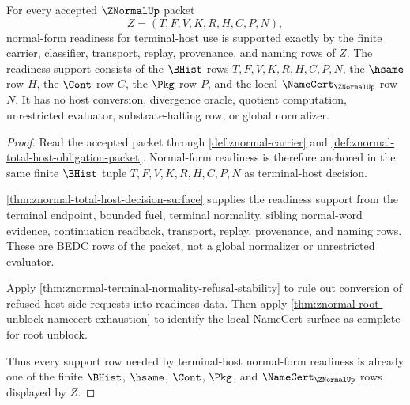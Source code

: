 \begin{theorem}
\label{thm:znormal-normal-form-readiness-support-totality}
For every accepted $\ZNormalUp$ packet
$$
Z=(T,F,V,K,R,H,C,P,N),
$$
normal-form readiness for terminal-host use is supported exactly by the finite carrier, classifier, transport, replay, provenance, and naming rows of $Z$. The readiness support consists of the $\BHist$ rows $T,F,V,K,R,H,C,P,N$, the $\hsame$ row $H$, the $\Cont$ row $C$, the $\Pkg$ row $P$, and the local $\NameCert_{\ZNormalUp}$ row $N$. It has no host conversion, divergence oracle, quotient computation, unrestricted evaluator, substrate-halting row, or global normalizer.
\end{theorem}
\begin{proof}
Read the accepted packet through \autoref{def:znormal-carrier} and \autoref{def:znormal-total-host-obligation-packet}. Normal-form readiness is therefore anchored in the same finite $\BHist$ tuple $T,F,V,K,R,H,C,P,N$ as terminal-host decision.

\autoref{thm:znormal-total-host-decision-surface} supplies the readiness support from the terminal endpoint, bounded fuel, terminal normality, sibling normal-word evidence, continuation readback, transport, replay, provenance, and naming rows. These are BEDC rows of the packet, not a global normalizer or unrestricted evaluator.

Apply \autoref{thm:znormal-terminal-normality-refusal-stability} to rule out conversion of refused host-side requests into readiness data. Then apply \autoref{thm:znormal-root-unblock-namecert-exhaustion} to identify the local NameCert surface as complete for root unblock.

Thus every support row needed by terminal-host normal-form readiness is already one of the finite $\BHist$, $\hsame$, $\Cont$, $\Pkg$, and $\NameCert_{\ZNormalUp}$ rows displayed by $Z$.
\end{proof}
